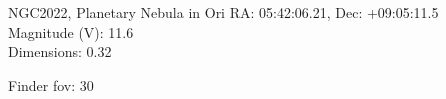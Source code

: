 \begin{block}{NGC2022, Planetary Nebula in Ori}
    RA: 05:42:06.21, Dec: +09:05:11.5 \\ 
    Magnitude (V): 11.6 \\ 
    Dimensions: 0.32 

    Finder fov: 30 
\end{block}